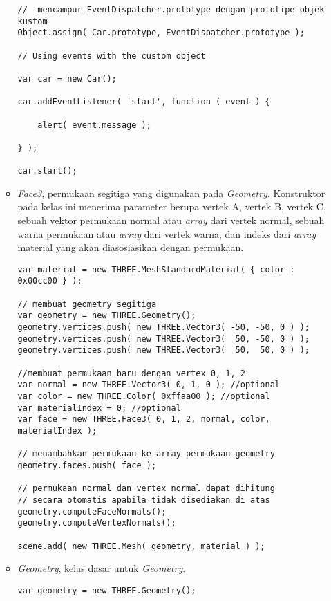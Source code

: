 \begin{itemize}
\begin{itemize}
\begin{lstlisting}[caption={Contoh penggunaan objek {\it EventDispatcher} untuk objek kustom.},captionpos=b]
//  mencampur EventDispatcher.prototype dengan prototipe objek kustom
Object.assign( Car.prototype, EventDispatcher.prototype );

// Using events with the custom object

var car = new Car();

car.addEventListener( 'start', function ( event ) {

    alert( event.message );

} );

car.start();
\end{lstlisting}

	\item{\it Face3}, permukaan segitiga yang digunakan pada {\it Geometry}. Konstruktor pada kelas ini menerima parameter berupa vertek A, vertek B, vertek C, sebuah vektor permukaan normal atau {\it array} dari vertek normal, sebuah warna permukaan atau {\it array} dari vertek warna, dan indeks dari {\it array} material yang akan diasosiasikan dengan permukaan.
\begin{lstlisting}[caption={Contoh penggunaan {\it Face3} pada suatu {\it Geometry}.},captionpos=b]
var material = new THREE.MeshStandardMaterial( { color : 0x00cc00 } );

// membuat geometry segitiga
var geometry = new THREE.Geometry();
geometry.vertices.push( new THREE.Vector3( -50, -50, 0 ) );
geometry.vertices.push( new THREE.Vector3(  50, -50, 0 ) );
geometry.vertices.push( new THREE.Vector3(  50,  50, 0 ) );

//membuat permukaan baru dengan vertex 0, 1, 2
var normal = new THREE.Vector3( 0, 1, 0 ); //optional
var color = new THREE.Color( 0xffaa00 ); //optional
var materialIndex = 0; //optional
var face = new THREE.Face3( 0, 1, 2, normal, color, materialIndex );

// menambahkan permukaan ke array permukaan geometry
geometry.faces.push( face );

// permukaan normal dan vertex normal dapat dihitung
// secara otomatis apabila tidak disediakan di atas
geometry.computeFaceNormals();
geometry.computeVertexNormals();

scene.add( new THREE.Mesh( geometry, material ) );
\end{lstlisting}

	\item{\it Geometry}, kelas dasar untuk {\it Geometry}.
\begin{lstlisting}[caption={Contoh instansiasi kelas {\it Geometry}.},captionpos=b]
var geometry = new THREE.Geometry();


\end{lstlisting}
\end{itemize}
\end{itemize}
